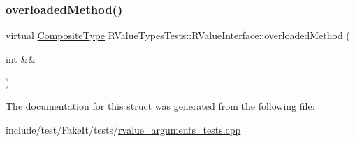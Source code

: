 \subsubsection{\texorpdfstring{overloadedMethod()}{overloadedMethod()}\hspace{0.1cm}{\footnotesize\ttfamily [2/2]}}
{\footnotesize\ttfamily virtual \mbox{\hyperlink{structRValueTypesTests_ae0674508758cee5fa643063720d87a20}{Composite\+Type}} R\+Value\+Types\+Tests\+::\+R\+Value\+Interface\+::overloaded\+Method (\begin{DoxyParamCaption}\item[{int \&\&}]{ }\end{DoxyParamCaption})\hspace{0.3cm}{\ttfamily [pure virtual]}}



The documentation for this struct was generated from the following file\+:\begin{DoxyCompactItemize}
\item 
include/test/\+Fake\+It/tests/\mbox{\hyperlink{rvalue__arguments__tests_8cpp}{rvalue\+\_\+arguments\+\_\+tests.\+cpp}}\end{DoxyCompactItemize}
